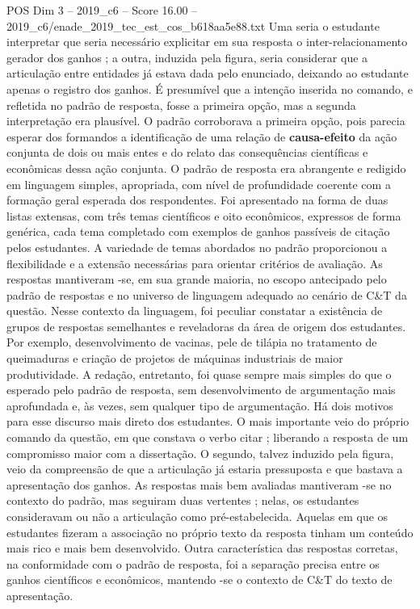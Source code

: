 \begin{textsample}{POS Dim 3 – 2019\_c6 – Score 16.00 – 2019\_c6/enade\_2019\_tec\_est\_cos\_b618aa5e88.txt}
Uma seria o estudante interpretar que seria necessário explicitar em sua resposta o inter-relacionamento gerador dos ganhos ; a outra, induzida pela figura, seria considerar que a articulação entre entidades já estava dada pelo enunciado, deixando ao estudante apenas o registro dos ganhos.
É presumível que a intenção inserida no comando, e refletida no padrão de resposta, fosse a primeira opção, mas a segunda interpretação era plausível.
O padrão corroborava a primeira opção, pois parecia esperar dos formandos a identificação de uma relação de \textbf{causa-efeito} da ação conjunta de dois ou mais entes e do relato das consequências científicas e econômicas dessa ação conjunta.
O padrão de resposta era abrangente e redigido em linguagem simples, apropriada, com nível de profundidade coerente com a formação geral esperada dos respondentes.
Foi apresentado na forma de duas listas extensas, com três temas científicos e oito econômicos, expressos de forma genérica, cada tema completado com exemplos de ganhos passíveis de citação pelos estudantes.
A variedade de temas abordados no padrão proporcionou a flexibilidade e a extensão necessárias para orientar critérios de avaliação.
As respostas mantiveram -se, em sua grande maioria, no escopo antecipado pelo padrão de respostas e no universo de linguagem adequado ao cenário de C\&T da questão.
Nesse contexto da linguagem, foi peculiar constatar a existência de grupos de respostas semelhantes e reveladoras da área de origem dos estudantes.
Por exemplo, desenvolvimento de vacinas, pele de tilápia no tratamento de queimaduras e criação de projetos de máquinas industriais de maior produtividade.
A redação, entretanto, foi quase sempre mais simples do que o esperado pelo padrão de resposta, sem desenvolvimento de argumentação mais aprofundada e, às vezes, sem qualquer tipo de argumentação.
Há dois motivos para esse discurso mais direto dos estudantes.
O mais importante veio do próprio comando da questão, em que constava o verbo citar ; liberando a resposta de um compromisso maior com a dissertação.
O segundo, talvez induzido pela figura, veio da compreensão de que a articulação já estaria pressuposta e que bastava a apresentação dos ganhos.
As respostas mais bem avaliadas mantiveram -se no contexto do padrão, mas seguiram duas vertentes ; nelas, os estudantes consideravam ou não a articulação como pré-estabelecida.
Aquelas em que os estudantes fizeram a associação no próprio texto da resposta tinham um conteúdo mais rico e mais bem desenvolvido.
Outra característica das respostas corretas, na conformidade com o padrão de resposta, foi a separação precisa entre os ganhos científicos e econômicos, mantendo -se o contexto de C\&T do texto de apresentação.

\end{textsample}
